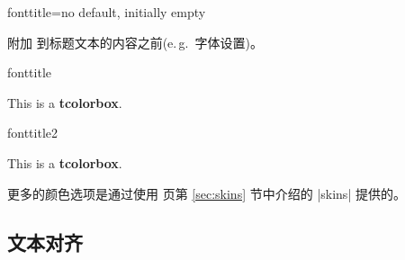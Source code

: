   
  \begin{docTcbKey}{fonttitle}{=}{no default, initially empty}
  
  附加  到标题文本的内容之前(e.\,g.\ 字体设置)。
  \begin{exdispExample}{fonttitle}
  \begin{tcolorbox}[fonttitle=\sffamily\bfseries\large,title=Hello]
  This is a \textbf{tcolorbox}.
  \end{tcolorbox}
  \end{exdispExample}
  \begin{exdispExample}{fonttitle2}
    \begin{tcolorbox}[fonttitle=只加了文字,title=Hello]
    This is a \textbf{tcolorbox}.
    \end{tcolorbox}
    \end{exdispExample}
  \end{docTcbKey}
  
  \bigskip
  \begin{marker}
  
  更多的颜色选项是通过使用 \pageref{sec:skins} 页第 \ref{sec:skins} 节中介绍的 |skins| 提供的。
  \end{marker}

  



\subsection{文本对齐}

